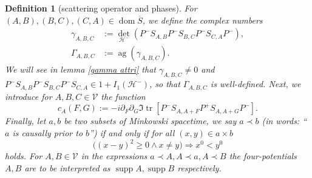 \documentclass[b5paper,draft,openbib,12pt]{memoir}
\newtheorem{Def}{Definition}
\DeclareMathOperator*{\supp}{supp}
\DeclareMathOperator{\tr}{tr}
\DeclareMathOperator{\ag}{ag}
\DeclareMathOperator{\dom}{dom}
\begin{document}
\begin{Def}[scattering operator and phases]
For \((A,B),(B,C), (C,A)\in\dom\overline{S}\), we define 
 the complex numbers 
\begin{align}\label{def: gamma}
\gamma_{A,B,C}&:=\det_{\mathcal{H}^-} (P^- S_{A,B} P^- S_{B,C} P^- S_{C,A}P^-),\\
\Gamma_{A,B,C}&:=\ag(\gamma_{A,B,C}).\label{def: Gamma}
\end{align}
We will see in lemma \ref{gamma attri} that 
\(\gamma_{A,B,C}\neq 0\) and
\( P^-S_{A,B}P^-S_{B,C}P^-S_{C,A}\in 1+I_1(\mathcal{H}^-)\), so 
that \(\Gamma_{A,B,C}\) is well-defined.
Next, we introduce for \(A,B,C\in\mathcal{V}\) the function
\begin{equation}
c_A(F,G):=-i \partial_F \partial_G  \Im \tr [P^- S_{A,A+F} P^+ S_{A,A+G} P^-] .
\end{equation}
Finally, 
let \(a,b\) be two subsets of Minkowski spacetime, we say \(a\prec b\) 
(in words: ``\(a\) is causally prior to \(b\)'') if 
and only if for all \((x,y)\in a \times b\)
\begin{equation}
  \big((x-y)^2\ge 0\wedge x\neq y\big) \Rightarrow x^0<y^0
\end{equation}
holds. For \(A,B\in \mathcal{V}\) in the expressions 
\(a\prec A, A\prec a, A\prec B \) the four-potentials \(A,B\)
are to be interpreted as \(\supp A, \supp B\) respectively.
\end{Def}
\end{document}
